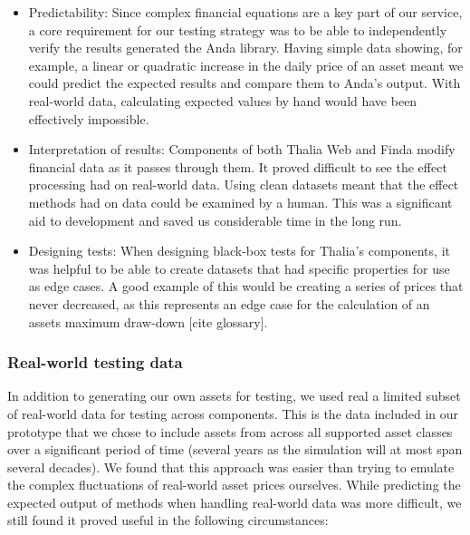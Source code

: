 \documentclass[main.tex]{subfiles}
\begin{document}
\begin{itemize}

\item Predictability:
Since complex financial equations are a key part of our service, a core requirement for our testing strategy was to be able to independently verify the results generated the Anda library. Having simple data showing, for example, a linear or quadratic increase in the daily price of an asset meant we could predict the expected results and compare them to Anda’s output. With real-world data, calculating expected values by hand would have been effectively impossible.

\item Interpretation of results:
Components of both Thalia Web and Finda modify financial data as it passes through them. It proved difficult to see the effect processing had on real-world data. Using clean datasets meant that the effect methods had on data could be examined by a human. This was a significant aid to development and saved us considerable time in the long run.

\item Designing tests:
When designing black-box tests for Thalia’s components, it was helpful to be able to create datasets that had specific properties for use as edge cases. A good example of this would be creating a series of prices that never decreased, as this represents an edge case for the calculation of an assets maximum draw-down [cite glossary].
\end{itemize}

\subsubsection{Real-world testing data}

In addition to generating our own assets for testing, we used real a limited subset of real-world data for testing across components. This is the data included in our prototype that we chose to include assets from across all supported asset classes over a significant period of time (several years as the simulation will at most span several decades). We found that this approach was easier than trying to emulate the complex fluctuations of real-world asset prices ourselves. While predicting the expected output of methods when handling real-world data was more difficult, we still found it proved useful in the following circumstances: 
\end{document}
